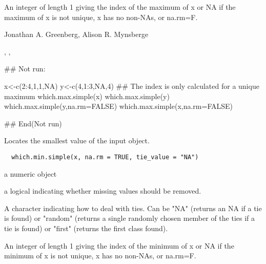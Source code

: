 \documentclass[a4paper]{book}
\begin{document}
%
\begin{Value}
An integer of length 1 giving the index of the maximum of
x or NA if the maximum of x is not unique, x has no
non-NAs, or na.rm=F.
\end{Value}
%
\begin{Author}\relax
Jonathan A. Greenberg, Alison R. Mynsberge
\end{Author}
%
\begin{SeeAlso}\relax
{}, ,
\end{SeeAlso}
%
\begin{Examples}
\begin{ExampleCode}
## Not run: 

x<-c(2:4,1,1,NA)
y<-c(4,1:3,NA,4)
## The index is only calculated for a unique maximum
which.max.simple(x)
which.max.simple(y)
which.max.simple(y,na.rm=FALSE)
which.max.simple(x,na.rm=FALSE)

## End(Not run)
\end{ExampleCode}
\end{Examples}
%
\begin{Description}\relax
Locates the smallest value of the input object.
\end{Description}
%
\begin{Usage}
\begin{verbatim}
  which.min.simple(x, na.rm = TRUE, tie_value = "NA")
\end{verbatim}
\end{Usage}
%
\begin{Arguments}
\begin{ldescription}
\item[\code{x}] a numeric object

\item[\code{na.rm}] a logical indicating whether missing values
should be removed.

\item[\code{tie\_value}] A character indicating how to deal with
ties.  Can be "NA" (returns an NA if a tie is found) or
"random" (returns a single randomly chosen member of the
ties if a tie is found) or "first" (returns the first
class found).
\end{ldescription}
\end{Arguments}
%
\begin{Value}
An integer of length 1 giving the index of the minimum of
x or NA if the minimum of x is not unique, x has no
non-NAs, or na.rm=F.
\end{Value}
\end{document}
